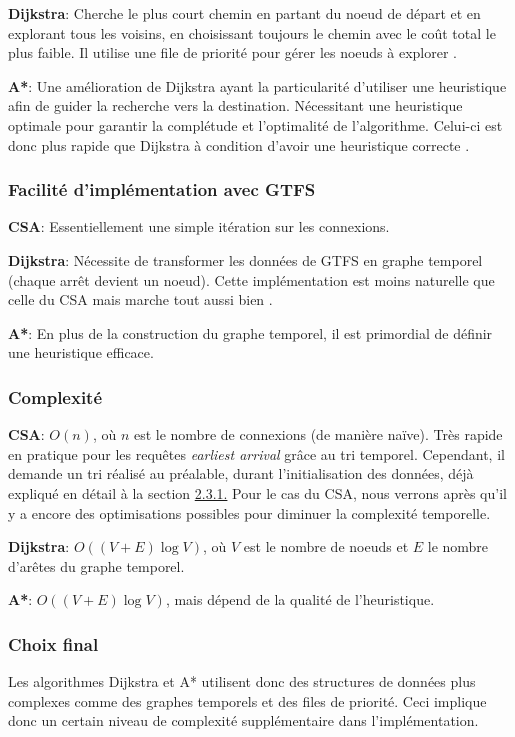 \documentclass[12pt]{article}
\begin{document}
\textbf{Dijkstra}: Cherche le plus court chemin en partant du noeud de départ et en explorant tous les voisins, en choisissant toujours le chemin avec 
le coût total le plus faible. Il utilise une file de priorité pour gérer les noeuds à explorer \cite{dijkstra1959note}.

\textbf{A*}: Une amélioration de Dijkstra ayant la particularité d'utiliser une heuristique afin de guider la recherche vers la destination. Nécessitant une
heuristique optimale pour garantir la complétude et l'optimalité de l'algorithme. Celui-ci est donc plus rapide que Dijkstra à condition d'avoir une heuristique
correcte \cite{astart2021literature}.

\subsubsection{Facilité d'implémentation avec GTFS}
\textbf{CSA}: Essentiellement une simple itération sur les connexions.

\textbf{Dijkstra}: Nécessite de transformer les données de GTFS en graphe temporel (chaque arrêt devient un noeud).
Cette implémentation est moins naturelle que celle du CSA mais marche tout aussi bien \cite{dijkstra1959note}.

\textbf{A*}: En plus de la construction du graphe temporel, il est primordial de définir une heuristique efficace.

\subsubsection{Complexité}
\textbf{CSA}: $O(n)$, où $n$ est le nombre de connexions (de manière naïve). Très rapide en pratique pour les requêtes \emph{earliest arrival} grâce au tri temporel. 
Cependant, il demande un tri réalisé au préalable, durant l'initialisation des données, déjà expliqué en détail à la section \hyperref[sec:complexitetempinit]{2.3.1.}
Pour le cas du CSA, nous verrons après qu'il y a encore des optimisations possibles pour diminuer la complexité temporelle.

\textbf{Dijkstra}: $O((V + E) \log V)$, où $V$ est le nombre de noeuds et $E$ le nombre d'arêtes du graphe temporel.

\textbf{A*}: $O((V + E) \log V)$, mais dépend de la qualité de l'heuristique.

\subsubsection{Choix final}
Les algorithmes Dijkstra et A* utilisent donc des structures de données plus complexes comme des graphes temporels et des files de priorité. Ceci implique donc
un certain niveau de complexité supplémentaire dans l'implémentation.
\end{document}
